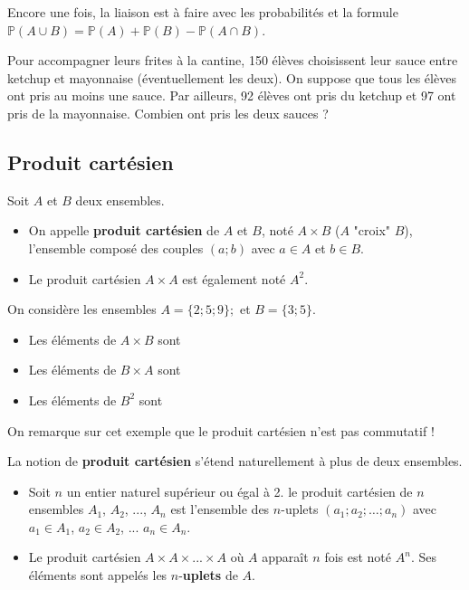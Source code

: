 \documentclass[11pt,fleqn, openany]{book} %
\begin{document}
Encore une fois, la liaison est à faire avec les probabilités et la formule $\mathbb{P}(A\cup B)=\mathbb{P}(A)+\mathbb{P}(B)-\mathbb{P}(A \cap B)$.

\begin{example}Pour accompagner leurs frites à la cantine, 150 élèves choisissent leur sauce entre ketchup et mayonnaise (éventuellement les deux). On suppose que tous les élèves ont pris au moins une sauce. Par ailleurs, 92 élèves ont pris du ketchup et 97 ont pris de la mayonnaise. Combien ont pris les deux sauces ?

\vskip50pt

\end{example}
\newpage
\subsection{Produit cartésien}

\begin{definition} Soit $A$ et $B$ deux ensembles.
 
 \begin{itemize}
 \item On appelle \textbf{produit cartésien} de $A$ et $B$, noté $A \times B$ ($A$ "croix" $B$), l'ensemble composé des couples $(a;b)$ avec $a \in A$ et $b \in B$. 
 \item Le produit cartésien $A\times A$ est également noté $A^2$.
\end{itemize}\end{definition}

\begin{example}On considère les ensembles $A=\{2;5;9\};$ et $B=\{3;5\}$.
\begin{itemize}
\item  Les éléments de $A \times B$ sont 
\item Les éléments de $B \times A$ sont 
\item Les éléments de $B^2$ sont 
\end{itemize}\end{example}

On remarque sur cet exemple que le produit cartésien n'est pas commutatif !

\begin{definition} La notion de \textbf{produit cartésien} s'étend naturellement à plus de deux ensembles. 
\begin{itemize}
 \item Soit $n$ un entier naturel supérieur ou égal à 2. le produit cartésien de $n$ ensembles $A_1$, $A_2$, ..., $A_n$ est l'ensemble des $n$-uplets $(a_1;a_2;\ldots;a_n)$ avec $a_1 \in A_1$, $a_2 \in A_2$, ... $ a_n \in A_n$.
 \item Le produit cartésien $A \times A \times ... \times A$ où $A$ apparaît $n$ fois est noté $A^n$. Ses éléments sont appelés les $n$-\textbf{uplets} de $A$.\end{itemize}
\end{definition}
\end{document}
